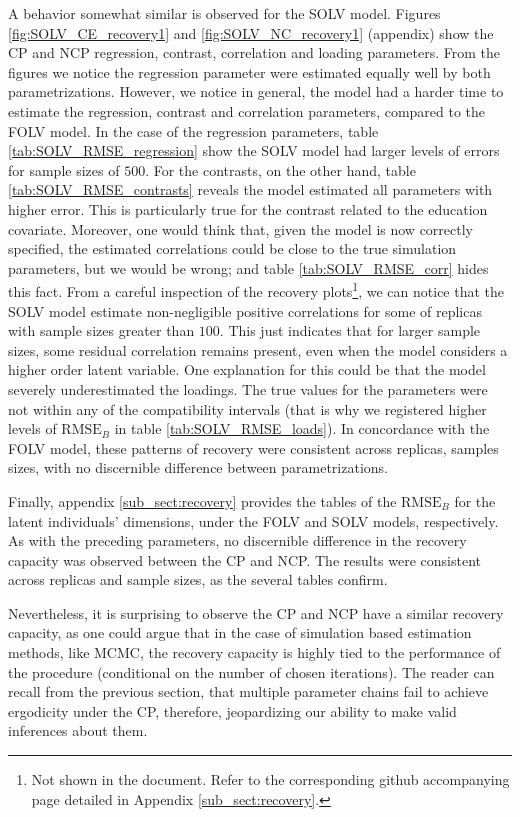 A behavior somewhat similar is observed for the SOLV model. Figures \ref{fig:SOLV_CE_recovery1} and \ref{fig:SOLV_NC_recovery1} (appendix) show the CP and NCP regression, contrast, correlation and loading parameters. From the figures we notice the regression parameter were estimated equally well by both parametrizations. However, we notice in general, the model had a harder time to estimate the regression, contrast and correlation parameters, compared to the FOLV model. In the case of the regression parameters, table \ref{tab:SOLV_RMSE_regression} show the SOLV model had larger levels of errors for sample sizes of $500$. For the contrasts, on the other hand, table \ref{tab:SOLV_RMSE_contrasts} reveals the model estimated all parameters with higher error. This is particularly true for the contrast related to the education covariate. Moreover, one would think that, given the model is now correctly specified, the estimated correlations could be close to the true simulation parameters, but we would be wrong; and table \ref{tab:SOLV_RMSE_corr} hides this fact. From a careful inspection of the recovery plots\footnote{Not shown in the document. Refer to the corresponding github accompanying page detailed in Appendix \ref{sub_sect:recovery}.}, we can notice that the SOLV model estimate non-negligible positive correlations for some of replicas with sample sizes greater than $100$. This just indicates that for larger sample sizes, some residual correlation remains present, even when the model considers a higher order latent variable. One explanation for this could be that the model severely underestimated the loadings. The true values for the parameters were not within any of the compatibility intervals (that is why we registered higher levels of $\text{RMSE}_{B}$ in table \ref{tab:SOLV_RMSE_loads}). In concordance with the FOLV model, these patterns of recovery were consistent across replicas, samples sizes, with no discernible difference between parametrizations.

Finally, appendix \ref{sub_sect:recovery} provides the tables of the $\text{RMSE}_{B}$ for the latent individuals' dimensions, under the FOLV and SOLV models, respectively. As with the preceding parameters, no discernible difference in the recovery capacity was observed between the CP and NCP. The results were consistent across replicas and sample sizes, as the several tables confirm. 

Nevertheless, it is surprising to observe the CP and NCP have a similar recovery capacity, as one could argue that in the case of simulation based estimation methods, like MCMC, the recovery capacity is highly tied to the performance of the procedure (conditional on the number of chosen iterations). The reader can recall from the previous section, that multiple parameter chains fail to achieve ergodicity under the CP, therefore, jeopardizing our ability to make valid inferences about them. 


